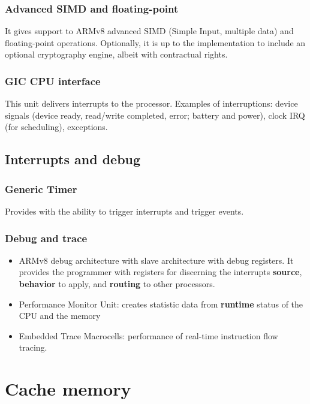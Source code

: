 \subsubsection*{Advanced SIMD and floating-point}
It gives support to ARMv8 advanced SIMD (Simple Input, multiple data) and floating-point operations. Optionally, it is up to the implementation to include an optional cryptography engine, albeit with contractual rights. \cite{cortexA72manual}

\subsubsection*{GIC CPU interface}
This unit delivers interrupts to the processor. Examples of interruptions: device signals (device ready, read/write completed, error; battery and power), clock IRQ (for scheduling), exceptions. \cite{cortexA72manual}

\subsection*{Interrupts and debug}


\subsubsection*{Generic Timer}
Provides with the ability to trigger interrupts and trigger events. \cite{cortexA72manual}

\subsubsection*{Debug and trace}

\begin{itemize}
	\item {ARMv8 debug architecture with slave architecture with debug registers. It provides the programmer with registers for discerning the interrupts \textbf{source}, \textbf{behavior} to apply, and \textbf{routing} to other processors.}
	\item {Performance Monitor Unit: creates statistic data from \textbf{runtime} status of the CPU and the memory}
	\item {Embedded Trace Macrocells: performance of real-time instruction flow tracing.}
	
	\cite{cortexA72manual}
\end{itemize}
\section{Cache memory}

